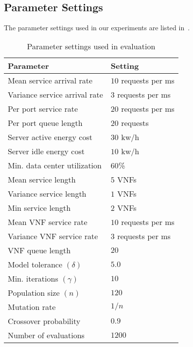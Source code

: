 \documentclass[journal]{IEEEtran}
\newcommand{\pref}{\prettyref}
\begin{document}
\subsection{Parameter Settings}
\label{sec:parameters}

The parameter settings used in our experiments are listed in~\pref{tab:parameter}.

\begin{table}[h]
    \vspace{1em}
    \centering
    
    \caption{Parameter settings used in evaluation}
    \label{tab:parameter}
    \begin{tabular}{ll}
        \hline
        Parameter                             & Setting        \\
        \hline
        Mean service arrival rate             & $10$ requests per ms \\
        Variance service arrival rate         & $3$ requests per ms  \\
        \hline
        Per port service rate                 & $20$ requests per ms \\
        Per port queue length                 & $20$ requests    \\
        Server active energy cost             & $30$ kw/h        \\
        Server idle energy cost               & $10$ kw/h        \\
        \hline
        Min. data center utilization          & $60$\%           \\
        Mean service length                   & $5$ VNFs         \\
        Variance service length               & $1$ VNFs         \\
        Min service length                    & $2$ VNFs         \\
        \hline
        Mean VNF service rate                 & $10$ requests per ms \\
        Variance VNF service rate             & $3$ requests per ms  \\
        VNF queue length                      & $20$             \\
        \hline
        Model tolerance $\left(\delta\right)$ & $5.0$            \\
        Min. iterations $\left(\gamma\right)$ & $10$             \\
        \hline
        Population size $\left(n\right)$      & $120$            \\
        Mutation rate                         & $1/n$          \\
        Crossover probability                 & $0.9$            \\
        Number of evaluations                 & $1200$           \\
        \hline
    \end{tabular}
\end{table}




\end{document}
